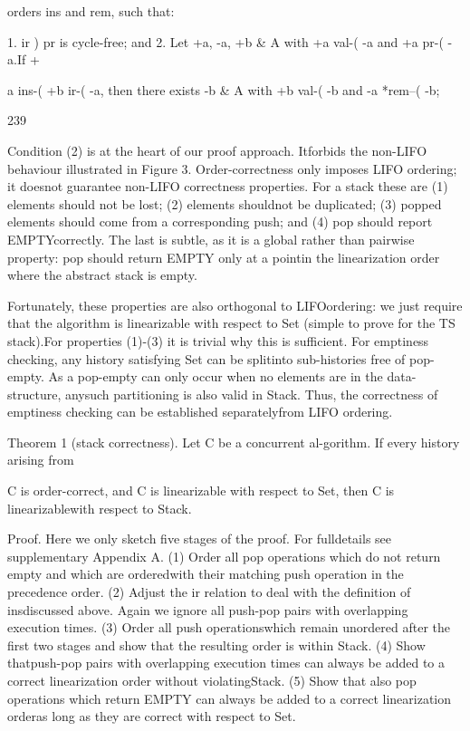 orders ins and rem, such that:

1. ir ) pr is cycle-free; and
2. Let +a, -a, +b & A with +a val-( -a and +a pr-( -a.If +

a ins-( +b ir-( -a, then there exists -b & A with
+b val-( -b and -a *rem--( -b;

239

Condition (2) is at the heart of our proof approach. Itforbids the non-LIFO behaviour illustrated in Figure 3.
Order-correctness only imposes LIFO ordering; it doesnot guarantee non-LIFO correctness properties. For a stack
these are (1) elements should not be lost; (2) elements shouldnot be duplicated; (3) popped elements should come from
a corresponding push; and (4) pop should report EMPTYcorrectly. The last is subtle, as it is a global rather than
pairwise property: pop should return EMPTY only at a pointin the linearization order where the abstract stack is empty.

Fortunately, these properties are also orthogonal to LIFOordering: we just require that the algorithm is linearizable
with respect to Set (simple to prove for the TS stack).For properties (1)-(3) it is trivial why this is sufficient. For
emptiness checking, any history satisfying Set can be splitinto sub-histories free of pop-empty. As a pop-empty can
only occur when no elements are in the data-structure, anysuch partitioning is also valid in Stack. Thus, the correctness of emptiness checking can be established separatelyfrom LIFO ordering.

Theorem 1 (stack correctness). Let C be a concurrent al-gorithm. If every history arising from

C is order-correct, and
C is linearizable with respect to Set, then C is linearizablewith respect to Stack.

Proof. Here we only sketch five stages of the proof. For fulldetails see supplementary Appendix A. (1) Order all pop
operations which do not return empty and which are orderedwith their matching push operation in the precedence order.
(2) Adjust the ir relation to deal with the definition of insdiscussed above. Again we ignore all push-pop pairs with
overlapping execution times. (3) Order all push operationswhich remain unordered after the first two stages and show
that the resulting order is within Stack. (4) Show thatpush-pop pairs with overlapping execution times can always
be added to a correct linearization order without violatingStack. (5) Show that also pop operations which return
EMPTY can always be added to a correct linearization orderas long as they are correct with respect to Set.


